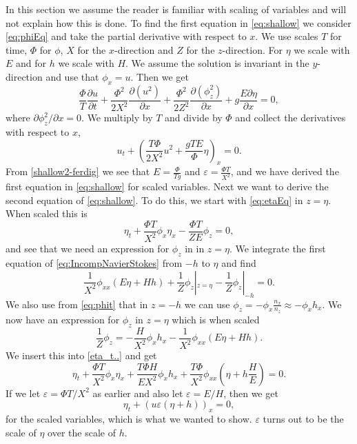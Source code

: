 \documentclass[11pt]{article}
\begin{document}
In this section we assume the reader is familiar with scaling of variables and will not explain how this is done. To find the first equation in \eqref{eq:shallow} we consider \eqref{eq:phiEq} and take the partial derivative
with respect to $x$. We use scales $T$ for time, $\Phi$ for $\phi$, $X$ for the $x$-direction and $Z$ for the $z$-direction. For $\eta$ we scale with $E$ and for $h$ we scale with $H$. We assume the solution is
invariant in the $y$-direction and use that $\phi_x=u$. Then we get 
\begin{equation*}
    \frac{\Phi}{T}\frac{\partial u}{\partial t} + \frac{\Phi^2}{2X^2}\frac{\partial (u^2)}{\partial x}+ \frac{\Phi^2}{2Z^2}\frac{\partial(\phi_z^2)}{\partial x} + g\frac{E \partial \eta}{\partial x} = 0,
\end{equation*}
where $\partial\phi_z^2/\partial x=0$. We multiply by $T$ and divide by $\Phi$ and collect the derivatives with respect to $x$,
\begin{equation}
    \label{shallow2-ferdig}
    u_t + \left(\frac{T\Phi}{2X^2}u^2 + \frac{gTE}{\Phi}\eta\right)_x = 0.
\end{equation}
From \eqref{shallow2-ferdig} we see that $E = \frac{\Phi}{T g}$ and $\varepsilon =\frac{\Phi T}{X^2}$, and we have derived the first equation in \eqref{eq:shallow} for scaled variables.
%
%
Next we want to derive the second equation of \eqref{eq:shallow}. To do this, we start with \eqref{eq:etaEq} in $z = \eta$. When scaled this is 
\begin{equation}
    \label{eta_t..}
    \eta_t + \frac{\Phi T}{X^2}\phi_x\eta_x - \frac{\Phi T}{ZE}\phi_z = 0,
\end{equation}
and see that we need an expression for $\phi_z$ in in $z = \eta$. We integrate the first equation of \eqref{eq:IncompNavierStokes} from $-h$ to $\eta$ and find 
\begin{equation*}    
    \frac{1}{X^2}\phi_{xx}(E\eta + Hh) + \frac{1}{Z}\phi_z|_{z=\eta} - \frac{1}{Z}\phi_z|_{-h} = 0.
\end{equation*}
We also use from \eqref{eq:phit} that in $z = -h$ we can use $\phi_z = -\phi_x\frac{n_x}{n_z} \approx -\phi_x h_x$. We now have an expression for $\phi_z$ in $z = \eta$ which is when scaled
\begin{equation*}
    \frac{1}{Z}\phi_z = - \frac{H}{X^2}\phi_x h_x - \frac{1}{X^2}\phi_{xx}(E\eta + Hh).
\end{equation*}
We insert this into \eqref{eta_t..} and get
\begin{equation} 
    \eta_t + \frac{\Phi T}{X^2}\phi_x\eta_x + \frac{T\Phi H}{EX^2}\phi_x h_x + \frac{T\Phi}{X^2}\phi_{xx}(\eta + h\frac{H}{E}) = 0.
\end{equation}
If we let $\varepsilon = \Phi T/X^2 $ as earlier and also let $\varepsilon = E/H$, then we get
\begin{equation*}
    \eta_t + (u\varepsilon(\eta + h))_x = 0,
\end{equation*}
for the scaled variables, which is what we wanted to show. $\varepsilon$ turns out to be the scale of $\eta$ over the scale of $h$.
\end{document}
